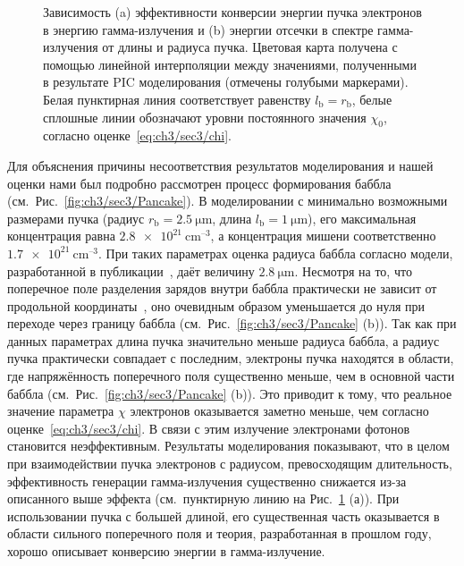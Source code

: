 \begin{figure}[ht]
    \caption[Зависимость эффективности конверсии энергии пучка электронов в энергию гамма-излучения и энергии отсечки в спектре гамма-излучения от длины и радиуса пучка]{Зависимость (a) эффективности конверсии энергии пучка электронов в энергию гамма-излучения и (b) энергии отсечки в спектре гамма-излучения от длины и радиуса пучка.
    Цветовая карта получена с помощью линейной интерполяции между значениями, полученными в результате PIC моделирования (отмечены голубыми маркерами).
    Белая пунктирная линия соответствует равенству $l_\mathrm{b} = r_\mathrm{b}$, белые сплошные линии обозначают уровни постоянного значения $\chi_0$, согласно оценке~\eqref{eq:ch3/sec3/chi}.}
    \label{fig:ch3/sec3/Efficiency}
\end{figure}

Для объяснения причины несоответствия результатов моделирования и нашей оценки нами был подробно рассмотрен процесс формирования баббла (см.~Рис.~\ref{fig:ch3/sec3/Pancake}).
В моделировании с минимально возможными размерами пучка (радиус $r_\mathrm{b} = \SI{2.5}{\um}$, длина $l_\mathrm{b} = \SI{1}{\um}$), его максимальная концентрация равна $\SI{2.8e21}{\centi\meter^{–3}}$, а концентрация мишени соответственно $\SI{1.7e21}{\centi\meter^{–3}}$.
При таких параметрах оценка радиуса баббла согласно модели, разработанной в публикации~\cite{golovanov2021excitation}, даёт величину $\SI{2.8}{\um}$.
Несмотря на то, что поперечное поле разделения зарядов внутри баббла практически не зависит от продольной координаты~\cite{kostyukov2004phenomenological}, оно очевидным образом уменьшается до нуля при переходе через границу баббла (см.~Рис.~\ref{fig:ch3/sec3/Pancake} (b)).
Так как при данных параметрах длина пучка значительно меньше радиуса баббла, а радиус пучка практически совпадает с последним, электроны пучка находятся в области, где напряжённость поперечного поля существенно меньше, чем в основной части баббла (см.~Рис.~\ref{fig:ch3/sec3/Pancake} (b)).
Это приводит к тому, что реальное значение параметра $\chi$ электронов оказывается заметно меньше, чем согласно оценке~\eqref{eq:ch3/sec3/chi}.
В связи с этим излучение электронами фотонов становится неэффективным.
Результаты моделирования показывают, что в целом при взаимодействии пучка электронов с радиусом, превосходящим длительность, эффективность генерации гамма-излучения существенно снижается из-за описанного выше эффекта (см.~пунктирную линию на Рис.~\ref{fig:ch3/sec3/Efficiency} (а)).
При использовании пучка с большей длиной, его существенная часть оказывается в области сильного поперечного поля и теория, разработанная в прошлом году, хорошо описывает конверсию энергии в гамма-излучение. 

